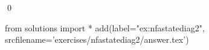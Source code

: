 
\begin{ex} 
  \label{ex:nfastatediag2}
  
  \qed
\end{ex} 
\begin{python0}
from solutions import *
add(label="ex:nfastatediag2",
    srcfilename='exercises/nfastatediag2/answer.tex') 
\end{python0}
